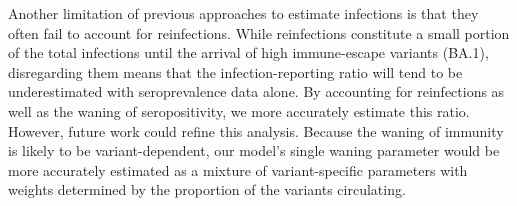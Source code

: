 Another limitation of previous approaches to estimate infections is that they
often fail to account for reinfections. While reinfections constitute a small
portion of the total infections until the arrival of high immune-escape variants
(BA.1), disregarding them means that the infection-reporting ratio will tend to
be underestimated with seroprevalence data alone. By accounting for reinfections
as well as the waning of seropositivity, we more accurately estimate this ratio.
However, future work could refine this analysis. Because the waning of immunity
is likely to be variant-dependent, \citep{pooley2023durability} our model's
single waning parameter would be more accurately estimated as a mixture of
variant-specific parameters with weights determined by the proportion of the
variants circulating. 

